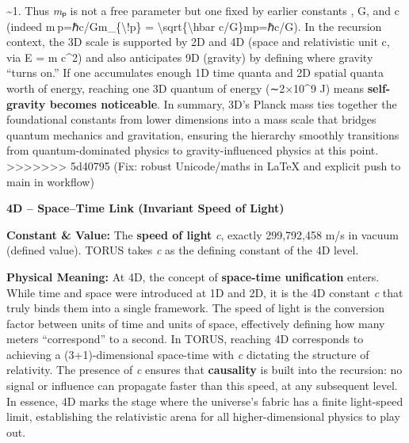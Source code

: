 \documentclass[]{article}
\begin{document}
\textasciitilde{}1​. Thus \emph{m}ₚ is not a free parameter but one
fixed by earlier constants \hbar, G, and c (indeed
m ⁣p=ℏc/Gm\_\{\textbackslash{}!p\} =
\textbackslash{}sqrt\{\textbackslash{}hbar c/G\}mp​=ℏc/G​). In the
recursion context, the 3D scale is supported by 2D and 4D (space and
relativistic unit c, via E = m c\^{}2) and also anticipates 9D (gravity)
by defining where gravity ``turns on.'' If one accumulates enough 1D
time quanta and 2D spatial quanta worth of energy, reaching one 3D
quantum of energy (∼2×10\^{}9 J) means \textbf{self-gravity becomes
noticeable}​. In summary, 3D's Planck mass ties together the
foundational constants from lower dimensions into a mass scale that
bridges quantum mechanics and gravitation, ensuring the hierarchy
smoothly transitions from quantum-dominated physics to
gravity-influenced physics at this point.
>>>>>>> 5d40795 (Fix: robust Unicode/maths in LaTeX and explicit push to main in workflow)

\textbf{4D -- Space--Time Link (Invariant Speed of Light)}

\textbf{Constant \& Value:} The \textbf{speed of light} \emph{c},
exactly 299,792,458 m/s in vacuum (defined value)​. TORUS takes \emph{c}
as the defining constant of the 4D level.

\textbf{Physical Meaning:} At 4D, the concept of \textbf{space-time
unification} enters. While time and space were introduced at 1D and 2D,
it is the 4D constant \emph{c} that truly binds them into a single
framework. The speed of light is the conversion factor between units of
time and units of space​, effectively defining how many meters
``correspond'' to a second. In TORUS, reaching 4D corresponds to
achieving a (3+1)-dimensional space-time with \emph{c} dictating the
structure of relativity. The presence of \emph{c} ensures that
\textbf{causality} is built into the recursion: no signal or influence
can propagate faster than this speed, at any subsequent level​. In
essence, 4D marks the stage where the universe's fabric has a finite
light-speed limit, establishing the relativistic arena for all
higher-dimensional physics to play out.
\end{document}

